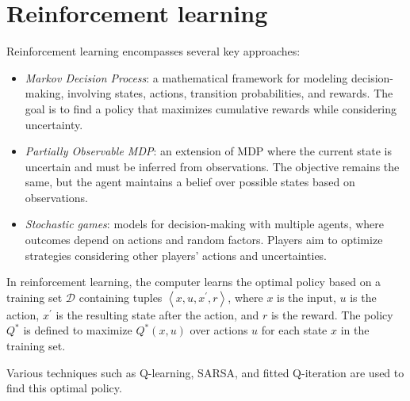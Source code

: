 \section{Reinforcement learning}

Reinforcement learning encompasses several key approaches:
\begin{itemize}
    \item \textit{Markov Decision Process}: a mathematical framework for modeling decision-making, involving states, actions, transition probabilities, and rewards. 
        The goal is to find a policy that maximizes cumulative rewards while considering uncertainty.
    \item \textit{Partially Observable MDP}: an extension of MDP where the current state is uncertain and must be inferred from observations. 
        The objective remains the same, but the agent maintains a belief over possible states based on observations.
    \item \textit{Stochastic games}: models for decision-making with multiple agents, where outcomes depend on actions and random factors. 
        Players aim to optimize strategies considering other players' actions and uncertainties.
\end{itemize}
In reinforcement learning, the computer learns the optimal policy based on a training set $\mathcal{D}$ containing tuples $\left\langle x,u,x^\prime,r \right\rangle$, where $x$ is the input, $u$ is the action, $x^\prime$ is the resulting state after the action, and $r$ is the reward.
The policy $Q^\ast$ is defined to maximize $Q^\ast(x,u)$ over actions $u$ for each state $x$ in the training set. 

Various techniques such as Q-learning, SARSA, and fitted Q-iteration are used to find this optimal policy.